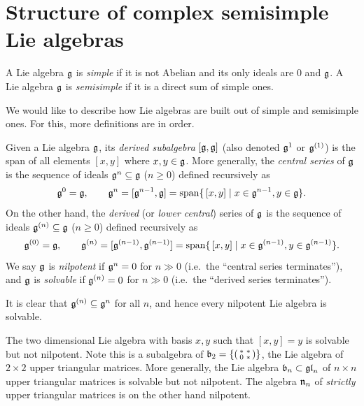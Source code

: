 \section{Structure of complex semisimple Lie algebras}
\begin{definition}
    A Lie algebra $\mathfrak{g}$ is \emph{simple} if it is not Abelian and its only
    ideals are $0$ and $\mathfrak{g}$. A Lie algebra $\mathfrak{g}$ is \emph{semisimple} if it is
    a direct sum of simple ones.
\end{definition}

We would like to describe how Lie algebras are built out of simple and
semisimple ones. For this, more definitions are in order.

\begin{definition}
    Given a Lie algebra $\mathfrak{g}$, its \emph{derived subalgebra}
    $[\mathfrak{g},\mathfrak{g}]$ (also denoted $\mathfrak{g}^1$ or $\mathfrak{g}^{(1)}$) is the span of
    all elements $[x,y]$ where $x,y\in \mathfrak{g}$. More generally, the \emph{central series} of $\mathfrak{g}$ is the sequence of ideals
    $\mathfrak{g}^n\subseteq \mathfrak{g}$ ($n\geq 0$) defined recursively as
    \[\mathfrak{g}^0=\mathfrak{g}, \qquad \mathfrak{g}^n = [\mathfrak{g}^{n-1}, \mathfrak{g}] =
    \text{span}\{\,[x,y]\;|\; x\in \mathfrak{g}^{n-1}, y\in\mathfrak{g}\}.\] 
    On the other hand, the \emph{derived} (or \emph{lower central}) series of
    $\mathfrak{g}$ is the sequence of ideals $\mathfrak{g}^{(n)}\subseteq \mathfrak{g}$ ($n\geq
    0$) defined recursively as
    \[
        \mathfrak{g}^{(0)}=\mathfrak{g}, \qquad \mathfrak{g}^{(n)} = [\mathfrak{g}^{(n-1)},
        \mathfrak{g}^{(n-1)}] = \text{span}\{\,[x,y]\;|\; x\in \mathfrak{g}^{(n-1)}, y\in
        \mathfrak{g}^{(n-1)}\}.
    \] 
    We say $\mathfrak{g}$ is \emph{nilpotent} if $\mathfrak{g}^n=0$ for $n\gg 0$ (i.e.\ the
    ``central series terminates''), and $\mathfrak{g}$ is \emph{solvable} if $\mathfrak{g}^{(n)}=0$
    for $n\gg 0$ (i.e.\ the ``derived series terminates'').
\end{definition}

It is clear that $\mathfrak{g}^{(n)}\subseteq \mathfrak{g}^n$ for all $n$, and hence every
nilpotent Lie algebra is solvable. 

\begin{example}
    The two dimensional Lie algebra with basis $x,y$ such that $[x,y]=y$ is
    solvable but not nilpotent. Note this is a subalgebra of $\mathfrak{b}_2=\{\left(\begin{smallmatrix} \ast
    & \ast \\ 0 &\ast \end{smallmatrix}\right)\}$, the Lie
    algebra of $2\times 2$ upper triangular matrices. More generally, the Lie
    algebra $\mathfrak{b}_n\subset \mathfrak{gl}_n$ of $n\times n$ upper triangular matrices is
    solvable but not nilpotent. The algebra $\mathfrak{n}_n$ of \emph{strictly} upper
    triangular matrices is on the other hand nilpotent.
\end{example}

